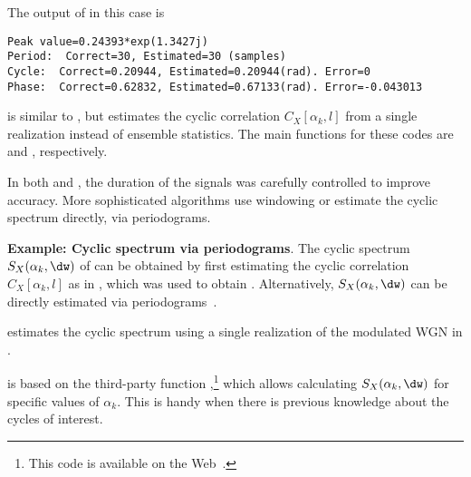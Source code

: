 The output of  in this case is
\begin{verbatim}
Peak value=0.24393*exp(1.3427j)
Period:  Correct=30, Estimated=30 (samples)
Cycle:  Correct=0.20944, Estimated=0.20944(rad). Error=0
Phase:  Correct=0.62832, Estimated=0.67133(rad). Error=-0.043013
\end{verbatim}

 is similar to , but estimates the cyclic correlation $C_{X}[\alpha_k,l]$ from a single realization instead of ensemble statistics.
The main functions for these codes are  and , respectively.
\eExample 

In both  and , the duration of the signals was
carefully controlled to improve accuracy. More sophisticated algorithms use windowing or estimate
the cyclic spectrum directly, via periodograms.


\bExample \textbf{Example: Cyclic spectrum via periodograms}.
The cyclic spectrum $S_{X}(\alpha_k,\dw)$ of  can be 
obtained by first estimating the cyclic correlation $C_{X}[\alpha_k,l]$ as in 
, which was used to obtain .
Alternatively, $S_{X}(\alpha_k,\dw)$ can be directly estimated via periodograms~\cite{Antoni07,Gini98}.

 estimates the cyclic spectrum using a single realization of the modulated WGN in .



 is based on the third-party function
,\footnote{This code is available on the Web~\cite{Antoni07}.} which allows calculating $S_{X}(\alpha_k,\dw)$ for specific values of $\alpha_k$. This is handy when there is 
previous knowledge about the cycles of interest.


